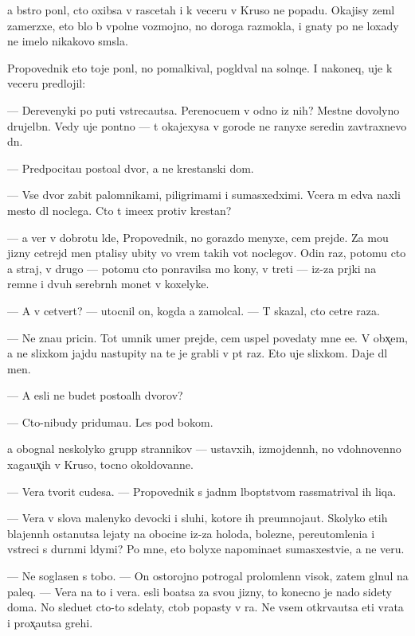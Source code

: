 \documentclass[10pt]{book}
\begin{document}
{\Y}a b{\yi}stro pon{\ia}l, cto oxibsa v rascetah i k veceru v Kruso ne popadu. Okajisy zeml{\ia} zamerzxe{\y}, eto b{\yi}lo b{\yi} vpolne vozmojno, no doroga razmokla, i gnaty po ne{\y} loxady ne imelo nikakovo sm{\yi}sla.

Propovednik eto toje pon{\ia}l, no pomalkival, pogl{\ia}d{\yi}val na solnqe. I nakoneq, uje k veceru predlojil:

— Derevenyki po puti vstreca{\y}utsa. Perenocu{\y}em v odno{\y} iz nih? Mestn{\yi}{\y}e dovolyno drujel{\iu}bn{\yi}. Vedy uje pon{\ia}tno — t{\yi} okajexysa v gorode ne ranyxe seredin{\yi} zavtraxnevo dn{\ia}.

— Predpocita{\y}u posto{\y}al{\yi}{\y} dvor, a ne krest{\y}anski{\y} dom.

— Vse dvor{\yi} zabit{\yi} palomnikami, piligrimami i sumasxedximi. Vcera m{\yi} {\y}edva naxli mesto dl{\ia} noclega. Cto t{\yi} ime{\y}ex protiv krest{\y}an?

— {\Y}a ver{\iu} v dobrotu l{\iu}de{\y}, Propovednik, no gorazdo menyxe, cem prejde. Za mo{\y}u jizny cet{\yi}rejd{\yi} men{\ia} p{\yi}talisy ubity vo vrem{\ia} takih vot noclegov. Odin raz, potomu cto {\y}a straj, v drugo{\y} — potomu cto ponravilsa mo{\y} kony, v treti{\y} — iz-za pr{\ia}jki na remne i dvuh serebr{\ia}n{\yi}h monet v koxelyke.

— A v cetvert{\yi}{\y}? — utocnil on, kogda {\y}a zamolcal. — T{\yi} skazal, cto cet{\yi}re raza.

— Ne zna{\y}u pricin{\yi}. Tot umnik umer prejde, cem uspel povedaty mne {\y}e{\y}e. V obx̨em, {\y}a ne slixkom jajdu nastupity na te je grabli v p{\ia}t{\yi}{\y} raz. Eto uje slixkom. Daje dl{\ia} men{\ia}.

— A {\y}esli ne budet posto{\y}al{\yi}h dvorov?

— Cto-nibudy priduma{\y}u. Les pod bokom.

{\Y}a obognal neskolyko grupp strannikov — ustavxih, izmojdenn{\yi}h, no vdohnovenno xaga{\y}ux̨ih v Kruso, tocno okoldovann{\yi}{\y}e.

— Vera tvorit cudesa. — Propovednik s jadn{\yi}m l{\iu}bop{\yi}tstvom rassmatrival ih liqa.

— Vera v slova malenyko{\y} devocki i sluhi, kotor{\yi}{\y}e ih preumnoja{\y}ut. Skolyko etih blajenn{\yi}h ostanutsa lejaty na obocine iz-za holoda, bolezne{\y}, pereutomleni{\y}a i vstreci s durn{\yi}mi l{\iu}dymi? Po mne, eto bolyxe napomina{\y}et sumasxestvi{\y}e, a ne veru.

— Ne soglasen s tobo{\y}. — On ostorojno potrogal prolomlenn{\yi}{\y} visok, zatem gl{\ia}nul na paleq. — Vera na to i vera. {\Y}esli bo{\y}atsa za svo{\y}u jizny, to konecno je nado sidety doma. No sledu{\y}et cto-to sdelaty, ctob{\yi} popasty v ra{\y}. Ne vsem otkr{\yi}va{\y}utsa eti vrata i prox̨a{\y}utsa grehi.
\end{document}
